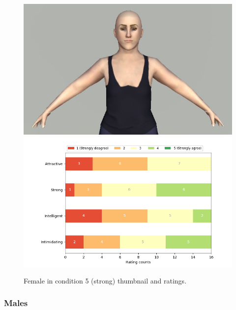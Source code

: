 \begin{figure}[H]
  \includegraphics[width=\linewidth]{Images/Females/2.JPG}
\endminipage\hfill
{}
  \includegraphics[width=\linewidth]{Survey/avatar_f_experiment5.png}
\endminipage\hfill
\caption{Female in condition 5 (strong) thumbnail and ratings.}
\end{figure}


\subsubsection{Males}

